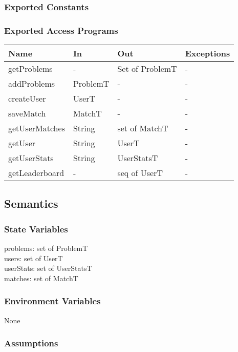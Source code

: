 \documentclass[12pt, titlepage]{article}
\begin{document}
\subsubsection{Exported Constants}

\subsubsection{Exported Access Programs}

\begin{center}
\begin{tabular}{p{6cm} p{2cm} p{3cm} p{2cm}}
\hline
\textbf{Name} & \textbf{In} & \textbf{Out} & \textbf{Exceptions} \\
\hline
getProblems & - & Set of ProblemT & - \\
addProblems & ProblemT & - & - \\
createUser & UserT & - & - \\
saveMatch & MatchT & - & - \\
getUserMatches & String & set of MatchT & - \\
getUser & String & UserT & - \\
getUserStats & String & UserStatsT & - \\
getLeaderboard & - & seq of UserT & - \\
\hline
\end{tabular}
\end{center}

\subsection{Semantics}

\subsubsection{State Variables}

problems: set of ProblemT\\
users: set of UserT\\
userStats: set of UserStatsT\\
matches: set of MatchT\\


\subsubsection{Environment Variables}

None

\subsubsection{Assumptions}
\end{document}
